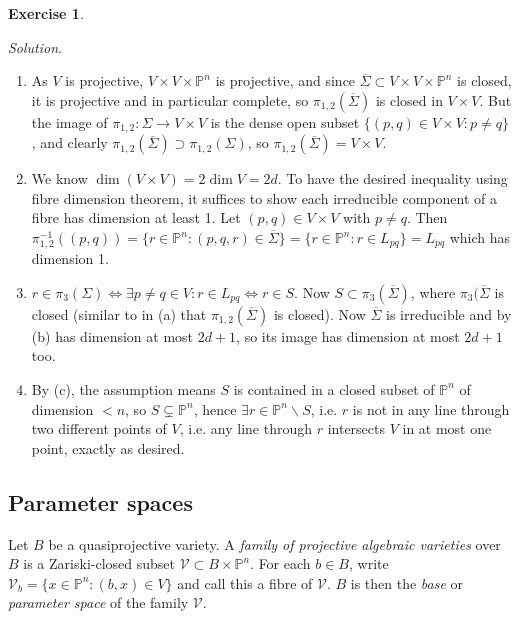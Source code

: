 \documentclass{article}
\newcommand{\p}{\mathbb{P}}
\newcommand{\V}{\mathcal{V}}
\theoremstyle{definition}
\newtheorem{exe}[defn]{Exercise}
\begin{document}
\begin{exe}
\begin{enumerate}
\textit{Solution}. \begin{enumerate}
\item As $V$ is projective, $V\times V\times\p^n$ is projective, and since $\overline\Sigma\subset V\times V\times\p^n$ is closed, it is projective and in particular complete, so $\pi_{1,2}(\overline\Sigma)$ is closed in $V\times V$. But the image of $\pi_{1,2}:\Sigma\rightarrow V\times V$ is the dense open subset $\{(p,q)\in V\times V:p\neq q\}$, and clearly $\pi_{1,2}(\overline\Sigma)\supset\pi_{1,2}(\Sigma)$, so $\pi_{1,2}(\overline\Sigma)=V\times V$.
\item We know $\dim(V\times V)=2\dim V=2d$. To have the desired inequality using fibre dimension theorem, it suffices to show each irreducible component of a fibre has dimension at least 1. Let $(p,q)\in V\times V$ with $p\neq q$. Then $\pi_{1,2}^{-1}((p,q))=\{r\in\p^n:(p,q,r)\in\overline{\Sigma}\}=\{r\in\p^n:r\in L_{pq}\}=L_{pq}$ which has dimension 1.
\item $r\in\pi_3(\Sigma)\iff\exists p\neq q\in V:r\in L_{pq}\iff r\in S$. Now $S\subset\pi_3(\overline\Sigma)$, where $\pi_3(\overline\Sigma$ is closed (similar to in (a) that $\pi_{1,2}(\overline\Sigma)$ is closed). Now $\overline{\Sigma}$ is irreducible and by (b) has dimension at most $2d+1$, so its image has dimension at most $2d+1$ too.
\item By (c), the assumption means $S$ is contained in a closed subset of $\p^n$ of dimension $<n$, so $S\subsetneq\p^n$, hence $\exists r\in\p^n\backslash S$, i.e. $r$ is not in any line through two different points of $V$, i.e. any line through $r$ intersects $V$ in at most one point, exactly as desired.
\end{enumerate}
\end{enumerate}
\end{exe}

\subsection{Parameter spaces}
Let $B$ be a quasiprojective variety. A \textit{family of projective algebraic varieties} over $B$ is a Zariski-closed subset $\V\subset B\times\p^n$. For each $b\in B$, write $\V_b=\{x\in\p^n:(b,x)\in V\}$ and call this a fibre of $\V$. $B$ is then the \textit{base} or \textit{parameter space} of the family $\V$.
\end{document}
